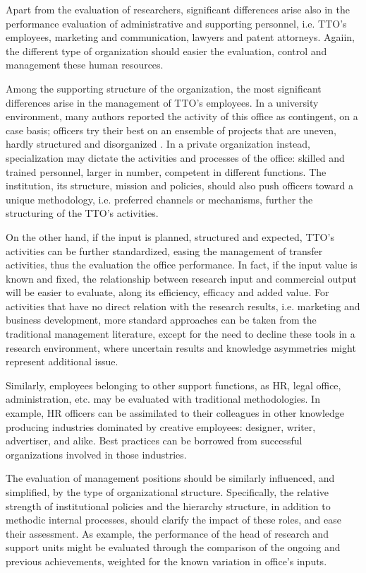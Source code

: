 Apart from the evaluation of researchers, significant differences arise also in the performance evaluation of administrative and supporting personnel, i.e. TTO's employees, marketing and communication, lawyers and patent attorneys. Agaiin, the different type of organization should easier the evaluation, control and management these human resources.

Among the supporting structure of the organization, the most significant differences arise in the management of TTO's employees. In a university environment, many authors reported the activity of this office as contingent, on a case basis; officers try their best on an ensemble of projects that are uneven, hardly structured and disorganized \citep{Jensen2003}. In a private organization instead, specialization may dictate the activities and processes of the office: skilled and trained personnel, larger in number, competent in different functions. The institution, its structure, mission and policies, should also push officers toward a unique methodology, i.e. preferred channels or mechanisms, further the structuring of the TTO's activities. 

On the other hand, if the input is planned, structured and expected, TTO's activities can be further standardized, easing the management of transfer activities, thus the evaluation the office performance. In fact, if the input value is known and fixed, the relationship between research input and commercial output will be easier to evaluate, along its efficiency, efficacy and added value. For activities that have no direct relation with the research results, i.e. marketing and business development, more standard approaches can be taken from the traditional management literature, except for the need to decline these tools in a research environment, where uncertain results and knowledge asymmetries might represent additional issue. 

Similarly, employees belonging to other support functions, as HR, legal office, administration, etc. may be evaluated with traditional methodologies. In example, HR officers can be assimilated to their colleagues in other knowledge producing industries dominated by creative employees: designer, writer, advertiser, and alike. Best practices can be borrowed from successful organizations involved in those industries.

The evaluation of management positions should be similarly influenced, and simplified, by the type of organizational structure. Specifically, the relative strength of institutional policies and the hierarchy structure, in addition to methodic internal processes, should clarify the impact of these roles, and ease their assessment. As example, the performance of the head of research and support units might be evaluated through the comparison of the ongoing and previous achievements, weighted for the known variation in office's inputs. 

